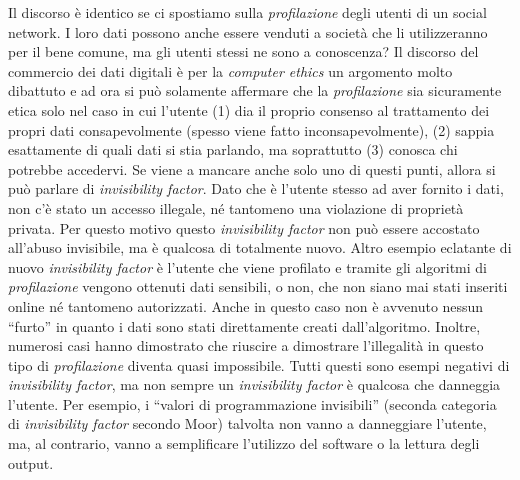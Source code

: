 Il discorso è identico se ci spostiamo sulla \textit{profilazione} degli utenti di un social network. I loro dati possono anche essere venduti a società che li utilizzeranno per il bene comune, ma gli utenti stessi ne sono a conoscenza? Il discorso del commercio dei dati digitali è per la \textit{computer ethics} un argomento molto dibattuto e ad ora si può solamente affermare che la \textit{profilazione} sia sicuramente etica solo nel caso in cui l’utente (1) dia il proprio consenso al trattamento dei propri dati consapevolmente (spesso viene fatto inconsapevolmente), (2) sappia esattamente di quali dati si stia parlando, ma soprattutto (3) conosca chi potrebbe accedervi. Se viene a mancare anche solo uno di questi punti, allora si può parlare di \textit{invisibility factor}. 
Dato che è l’utente stesso ad aver fornito i dati, non c’è stato un accesso illegale, né tantomeno una violazione di proprietà privata. Per questo motivo questo \textit{invisibility factor} non può essere accostato all’abuso invisibile, ma è qualcosa di totalmente nuovo.
Altro esempio eclatante di nuovo \textit{invisibility factor} è l’utente che viene profilato e tramite gli algoritmi di \textit{profilazione} vengono ottenuti dati sensibili, o non, che non siano mai stati inseriti online né tantomeno autorizzati. Anche in questo caso non è avvenuto nessun “furto” in quanto i dati sono stati direttamente creati dall’algoritmo. Inoltre, numerosi casi hanno dimostrato che riuscire a dimostrare l’illegalità in questo tipo di \textit{profilazione} diventa quasi impossibile. 
Tutti questi sono esempi negativi di \textit{invisibility factor}, ma non sempre un \textit{invisibility factor} è qualcosa che danneggia l’utente.
Per esempio, i “valori di programmazione invisibili” (seconda categoria di \textit{invisibility factor} secondo Moor) talvolta non vanno a danneggiare l’utente, ma, al contrario, vanno a semplificare l’utilizzo del software o la lettura degli output.